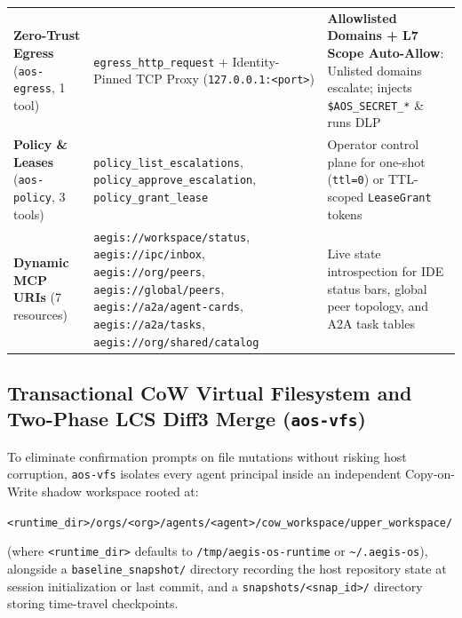 \documentclass[10pt,twocolumn]{article}
\begin{document}
\begin{table}[!t]
{\begin{tabular}{lll}
\textbf{Zero-Trust Egress} (\texttt{aos-egress}, 1 tool) & \texttt{egress\_http\_request} + Identity-Pinned TCP Proxy (\texttt{127.0.0.1:<port>}) & \textbf{Allowlisted Domains + L7 Scope Auto-Allow}: Unlisted domains escalate; injects \texttt{\$AOS\_SECRET\_*} \& runs DLP \\
\textbf{Policy \& Leases} (\texttt{aos-policy}, 3 tools) & \texttt{policy\_list\_escalations}, \texttt{policy\_approve\_escalation}, \texttt{policy\_grant\_lease} & Operator control plane for one-shot (\texttt{ttl=0}) or TTL-scoped \texttt{LeaseGrant} tokens \\
\textbf{Dynamic MCP URIs} (7 resources) & \texttt{aegis://workspace/status}, \texttt{aegis://ipc/inbox}, \texttt{aegis://org/peers}, \texttt{aegis://global/peers}, \texttt{aegis://a2a/agent-cards}, \texttt{aegis://a2a/tasks}, \texttt{aegis://org/shared/catalog} & Live state introspection for IDE status bars, global peer topology, and A2A task tables \\
\bottomrule
\end{tabular}%
}
\end{table}

\subsection{Transactional CoW Virtual Filesystem and Two-Phase LCS Diff3 Merge (\texttt{aos-vfs})}
\label{sec:vfs}

To eliminate confirmation prompts on file mutations without risking host corruption, \texttt{aos-vfs} isolates every agent principal inside an independent Copy-on-Write shadow workspace rooted at:
\begin{center}
{\footnotesize\texttt{<runtime\_dir>/orgs/<org>/agents/<agent>/cow\_workspace/\allowbreak upper\_workspace/}}
\end{center}
(where \texttt{<runtime\_dir>} defaults to \texttt{/tmp/\allowbreak aegis-os-runtime} or \texttt{\textasciitilde/.aegis-os}), alongside a \texttt{baseline\_snapshot/} directory recording the host repository state at session initialization or last commit, and a \texttt{snapshots/<snap\_id>/} directory storing time-travel checkpoints.
\end{document}
